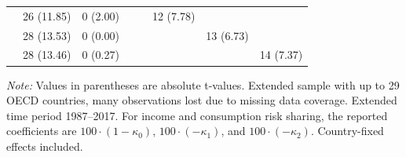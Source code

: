 \begin{table}[!htbp]
{\begin{tabular}{lccccccc}
& 26 (11.85) 
& 0 (2.00) 
& 
& 
& 12 (7.78) 
& 
& \\

& 28 (13.53) 
& 0 (0.00) 
& 
& 
& 
& 13 (6.73) 
& \\

& 28 (13.46) 
& 0 (0.27) 
& 
& 
& 
& 
& 14 (7.37) \\

\hline 
\hline
\end{tabular}%
}

\vspace{0.15cm}

\begin{minipage}{\linewidth}
\footnotesize
\textit{Note:} Values in parentheses are absolute t-values. Extended sample with up to 29 OECD countries, many observations lost due to missing data coverage. Extended time period 1987--2017. For income and consumption risk sharing, the reported coefficients are \(100 \cdot (1-\kappa_0)\), \(100 \cdot (-\kappa_1)\), and \(100 \cdot (-\kappa_2)\). Country-fixed effects included.
\end{minipage}

\end{table}